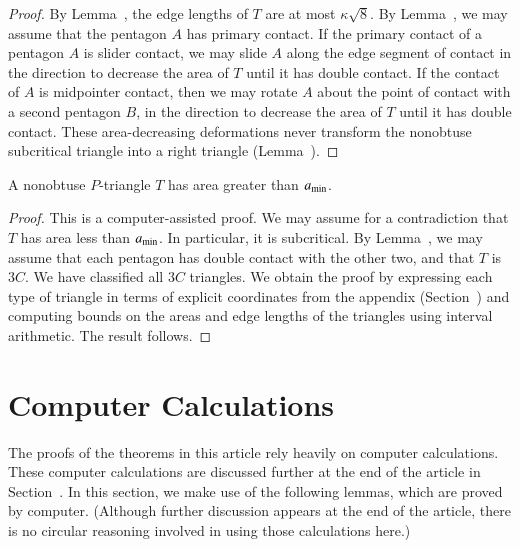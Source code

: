 \begin{proof}
  By Lemma~, the edge lengths of $T$ are at most
  $\kappa\sqrt8$.  By Lemma~, we may assume that
  the pentagon $A$ has primary contact.  If the primary contact of a
  pentagon $A$ is slider contact, we may slide $A$ along the edge
  segment of contact in the direction to decrease the area of $T$
  until it has double contact.  If the contact of $A$ is midpointer
  contact, then we may rotate $A$ about the point of contact with a
  second pentagon $B$, in the direction to decrease the area of $T$
  until it has double contact.  These area-decreasing deformations
  never transform the nonobtuse subcritical triangle into a right
  triangle (Lemma~).
\end{proof}


\begin{lemma}  
A nonobtuse $P$-triangle $T$ has area greater than $a_\text{min}$.
\end{lemma}

\begin{proof} 
  This is a computer-assisted proof.  We may assume for a contradiction
  that $T$ has area less than $a_\text{min}$.  In particular, it is
  subcritical.  By Lemma~, we may assume that each
  pentagon has double contact with the other two, and that $T$ is
  $3C$.  We have classified all $3C$ triangles.  We obtain the proof
  by expressing each type of triangle in terms of explicit
  coordinates from the appendix (Section~) and
  computing bounds on the areas and edge lengths of the triangles
  using interval arithmetic.  The result follows.
\end{proof}

\section{Computer Calculations}

The proofs of the theorems in this article rely heavily on computer
calculations.  These computer calculations are discussed further at
the end of the article in Section~.  In this section,
we make use of the following lemmas, which are proved by computer.
(Although further discussion appears at the end of the article, there
is no circular reasoning involved in using those calculations here.)

